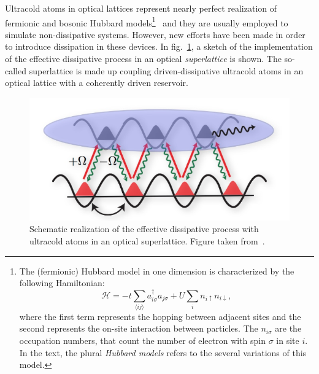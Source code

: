 Ultracold atoms in optical lattices represent nearly perfect realization of fermionic and bosonic Hubbard models\footnote{The (fermionic) Hubbard model in one dimension is characterized by the following Hamiltonian:
\begin{equation*}
    \mathcal{H} = -t\sum_{\langle ij \rangle}a^{\dagger}_{i\sigma}a_{j\sigma} + U\sum_i n_{i\uparrow}n_{i\downarrow},
\end{equation*}
where the first term represents the hopping between adjacent sites and the second represents the on-site interaction between particles. The $n_{i\sigma}$ are the occupation numbers, that count the number of electron with spin $\sigma$ in site $i$.
In the text, the plural \emph{Hubbard models} refers to the several variations of this model.
}~\cite{ultracoldAtoms_condMatter} and they are usually employed to simulate non-dissipative systems. However, new efforts have been made in order to introduce dissipation in these devices. 
In fig.~\ref{fig:optical_lattice_dissipation}, a sketch of the implementation of the effective dissipative process in an optical \emph{superlattice} is shown. The so-called superlattice is made up coupling driven-dissipative ultracold atoms in an optical lattice with a coherently driven reservoir. 

\begin{figure}
    \centering
    \includegraphics[scale=0.7]{Figures/optical_lattice_dissipation.png}
    \captionsetup{width=1.\linewidth}
    \caption{Schematic realization of the effective dissipative process with ultracold atoms in an optical superlattice. Figure taken from~\cite{diehl_wEbsite}.}
    \label{fig:optical_lattice_dissipation}
\end{figure}

